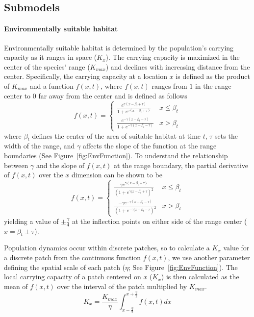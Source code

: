 \documentclass[12pt, oneside]{article}
\begin{document}
\subsection*{Submodels}
\paragraph{Environmentally suitable habitat}
Environmentally suitable habitat is determined by the population's carrying capacity as it ranges in space ($K_{x}$). The carrying capacity is maximized in the center of the species' range ($K_{max}$) and declines with increasing distance from the center. Specifically, the carrying capacity at a location $x$ is defined as the product of $K_{max}$ and a function $f(x,t)$, where $f(x,t)$ ranges from $1$ in the range center to $0$ far away from the center and is defined as follows 
\begin{equation}
f(x,t)=
\begin{cases}
	\frac{e^{\gamma(x-\beta_{t}+\tau)}}{1+e^{\gamma(x-\beta_{t}+\tau)}} & x \leq \beta_{t} \\
	\frac{e^{-\gamma(x-\beta_{t}-\tau)}}{1+e^{-\gamma(x-\beta_{t}-\tau)}} & x > \beta_{t}
\end{cases}
\end{equation}
where $\beta_{t}$ defines the center of the area of suitable habitat at time $t$, $\tau$ sets the width of the range, and $\gamma$ affects the slope of the function at the range boundaries (See Figure~\ref{fig:EnvFunction}). To understand the relationship between $\gamma$ and the slope of $f(x,t)$ at the range boundary, the partial derivative of $f(x,t)$ over the $x$ dimension can be shown to be
\begin{equation}
f(x,t)=
\begin{cases}
	\frac{\gamma e^{\gamma(x-\beta_{t}+\tau)}}{(1+e^{\gamma(x-\beta_{t}+\tau})^{2}} & x \leq \beta_{t} \\
	\frac{-\gamma e^{-\gamma(x-\beta_{t}-\tau)}}{(1+e^{-\gamma(x-\beta_{t}-\tau})^{2}} & x > \beta_{t}
\end{cases}	
\end{equation}
yielding a value of $\pm\frac{\gamma}{4}$ at the inflection points on either side of the range center ($x=\beta_{t}\pm\tau$).

Population dynamics occur within discrete patches, so to calculate a $K_{x}$ value for a discrete patch from the continuous function $f(x,t)$, we use another parameter defining the spatial scale of each patch ($\eta$; See Figure~\ref{fig:EnvFunction}). The local carrying capacity of a patch centered on $x$ ($K_{x}$) is then calculated as the mean of $f(x,t)$ over the interval of the patch multiplied by $K_{max}$.
\begin{equation}
K_{x} = \frac{K_{max}}{\eta}\int_{x-\frac{\eta}{2}}^{x+\frac{\eta}{2}}f(x,t)dx
\end{equation}
\end{document}
